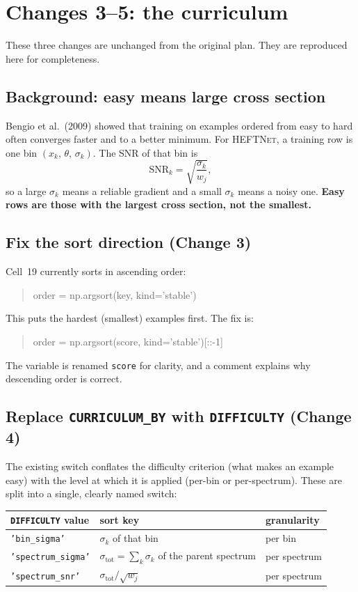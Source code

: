 \documentclass[11pt]{article}
\newcommand{\code}[1]{\texttt{#1}}
\begin{document}
\section{Changes 3--5: the curriculum}

These three changes are unchanged from the original plan. They are reproduced
here for completeness.

\subsection*{Background: easy means large cross section}

Bengio et al.\ (2009) showed that training on examples ordered from easy to
hard often converges faster and to a better minimum. For \textsc{HEFTNet}, a
training row is one bin $(x_k,\,\theta,\,\sigma_k)$. The SNR of that bin is
\[
  \mathrm{SNR}_k = \sqrt{\frac{\sigma_k}{w_j}},
\]
so a large $\sigma_k$ means a reliable gradient and a small $\sigma_k$ means
a noisy one. \textbf{Easy rows are those with the largest cross section, not
the smallest.}

\subsection{Fix the sort direction (Change 3)}

Cell~19 currently sorts in ascending order:
\begin{quote}\small\ttfamily
order = np.argsort(key, kind='stable')
\end{quote}
This puts the hardest (smallest) examples first. The fix is:
\begin{quote}\small\ttfamily
order = np.argsort(score, kind='stable')[::-1]
\end{quote}
The variable is renamed \code{score} for clarity, and a comment explains why
descending order is correct.

\subsection{Replace \texttt{CURRICULUM\_BY} with \texttt{DIFFICULTY} (Change 4)}

The existing switch conflates the difficulty criterion (what makes an example
easy) with the level at which it is applied (per-bin or per-spectrum). These
are split into a single, clearly named switch:

\begin{center}
\small
\begin{tabular}{lll}
\toprule
\code{DIFFICULTY} value & sort key & granularity \\
\midrule
\code{'bin\_sigma'} & $\sigma_k$ of that bin & per bin \\
\code{'spectrum\_sigma'} & $\sigma_\text{tot} = \sum_k \sigma_k$ of the parent
  spectrum & per spectrum \\
\code{'spectrum\_snr'} & $\sigma_\text{tot} / \sqrt{w_j}$ & per spectrum \\
\bottomrule
\end{tabular}
\end{center}
\end{document}
